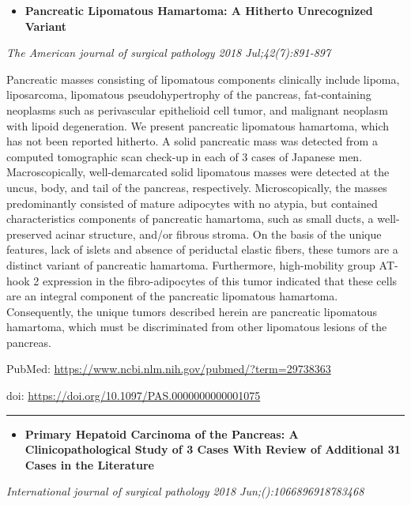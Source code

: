 \documentclass[]{article}
\providecommand{\tightlist}{%
  \setlength{\itemsep}{0pt}\setlength{\parskip}{0pt}}
\begin{document}
\begin{itemize}
\tightlist
\item
  \textbf{Pancreatic Lipomatous Hamartoma: A Hitherto Unrecognized
  Variant}
\end{itemize}

\emph{The American journal of surgical pathology 2018 Jul;42(7):891-897}

Pancreatic masses consisting of lipomatous components clinically include
lipoma, liposarcoma, lipomatous pseudohypertrophy of the pancreas,
fat-containing neoplasms such as perivascular epithelioid cell tumor,
and malignant neoplasm with lipoid degeneration. We present pancreatic
lipomatous hamartoma, which has not been reported hitherto. A solid
pancreatic mass was detected from a computed tomographic scan check-up
in each of 3 cases of Japanese men. Macroscopically, well-demarcated
solid lipomatous masses were detected at the uncus, body, and tail of
the pancreas, respectively. Microscopically, the masses predominantly
consisted of mature adipocytes with no atypia, but contained
characteristics components of pancreatic hamartoma, such as small ducts,
a well-preserved acinar structure, and/or fibrous stroma. On the basis
of the unique features, lack of islets and absence of periductal elastic
fibers, these tumors are a distinct variant of pancreatic hamartoma.
Furthermore, high-mobility group AT-hook 2 expression in the
fibro-adipocytes of this tumor indicated that these cells are an
integral component of the pancreatic lipomatous hamartoma. Consequently,
the unique tumors described herein are pancreatic lipomatous hamartoma,
which must be discriminated from other lipomatous lesions of the
pancreas.

PubMed: \url{https://www.ncbi.nlm.nih.gov/pubmed/?term=29738363}

doi: \url{https://doi.org/10.1097/PAS.0000000000001075}

{}

{}

\begin{center}\rule{0.5\linewidth}{\linethickness}\end{center}

\begin{itemize}
\tightlist
\item
  \textbf{Primary Hepatoid Carcinoma of the Pancreas: A
  Clinicopathological Study of 3 Cases With Review of Additional 31
  Cases in the Literature}
\end{itemize}

\emph{International journal of surgical pathology 2018
Jun;():1066896918783468}
\end{document}
